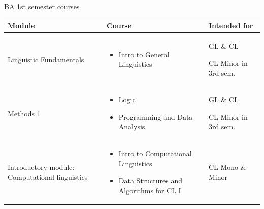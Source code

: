 \documentclass[aspectratio=169,hyperref={unicode},xcolor={dvipsnames}]{beamer}
\begin{document}
\begin{frame}{BA 1st semester courses}
\small
	\begin{center}
	\begin{table}[h]
		\begin{tabular}{p{}|p{}|p{}} 
		Module & Course & Intended for\\
		\hline
		Linguistic Fundamentals & \begin{itemize}\item Intro to General Linguistics\end{itemize} & GL \& CL \newline \begin{footnotesize}CL Minor in 3rd sem.\end{footnotesize}\\
		\hline
		Methods 1 & \begin{itemize}\item Logic \item Programming and Data Analysis\end{itemize} &  GL \& CL \newline \begin{footnotesize}CL Minor in 3rd sem.\end{footnotesize}\\
		\hline
		Introductory module: \newline Computational linguistics &  \begin{itemize}\item Intro to Computational Linguistics \item Data Structures and Algorithms for CL I \end{itemize}& CL \newline Mono \& Minor\\			
			\hline
\end{tabular}
\end{table}
	\end{center}
\end{frame}
\end{document}

